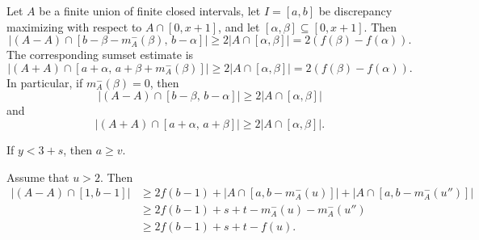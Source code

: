 \documentclass[10pt,a4paper]{amsart}
\def\F#1{f(#1)}
\begin{document}
\begin{lem}\label{minterv}
Let $A$ be a finite union of finite closed intervals, let $I=[a,b]$ be discrepancy maximizing with respect to $A\cap[0,x+1]$,
and let $[\alpha,\beta]\subseteq[0,x+1]$. Then
$$
    |(A-A)\cap [b-\beta-m_A^-(\beta),\, b-\alpha]|
    \geq 2|A\cap[\alpha,\beta]|=2(\F{\beta}-\F{\alpha}).
$$
The corresponding sumset estimate is
$$
    |(A+A)\cap [a+\alpha,\, a+\beta+m_A^-(\beta)]|
    \geq 2|A\cap[\alpha,\beta]|=2(\F{\beta}-\F{\alpha}).
$$
In particular, if $m_A^-(\beta)=0$, then
$$
    |(A-A)\cap [b-\beta,\, b-\alpha]|
    \geq 2|A\cap[\alpha,\beta]|
$$
and
$$
    |(A+A)\cap [a+\alpha,\, a+\beta]|
    \geq 2|A\cap[\alpha,\beta]|.
$$
\end{lem}

\begin{lem}
\label{small case} If $y<3+s$, then $a\geq v$. 
\end{lem}

\begin{lem} \label{double boost lem}
    Assume that $u>2$. Then
    \begin{align*}
        |(A - A)\cap [1, b - 1]|
        &\geq 2\F{b - 1}
        + |A\cap [a, b - m_A^-(u)]|
        + |A\cap [a, b - m_A^-(u'')]|\\
        &\geq 2\F{b - 1} + s + t - m_A^-(u) - m_A^-(u'')\\
        &\geq 2\F{b - 1} + s + t - \F{u} .
    \end{align*}
\end{lem}
\end{document}
